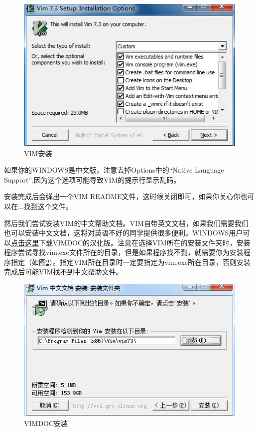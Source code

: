 \begin{figure}[htbp]
\centering
\includegraphics{tools/pic/vim_install_options.jpg}
\caption{VIM安装}
\label{fig:vim_install_options}
\end{figure}

如果你的WINDOWS是中文版，注意去掉Options中的“Native Language Support”,因为这个选项可能导致VIM的提示行显示乱码。

安装完成后会弹出一个VIM README文件，这时候关闭即可，如果你关心你也可以在...找到这个文件。

然后我们尝试安装VIM的中文帮助文档。VIM自带英文文档，如果我们需要我们也可以安装中文文档，这将对英语不好的同学提供很多便利。WINDOWS用户可以\href{ftp://ftp.vim.org/pub/vim/pc/gvim73_46.exe}{\textcolor[rgb]{0.0,0.0,1.0}{\uline{点击这里}}}下载VIMDOC的汉化版。注意在选择VIM所在的安装文件夹时，安装程序尝试寻找vim.exe文件所在的目录，但是如果程序找不到，就需要你为安装程序指定（如图\ref{fig:vimdoc_install_place}）。指定VIM所在目录时一定要指定为vim.exe所在目录，否则安装完成后可能VIM找不到中文帮助文件。
\begin{figure}[htbp]
\centering
\includegraphics{tools/pic/vimdoc_install_place.jpg}
\caption{VIMDOC安装}
\label{fig:vimdoc_install_place}
\end{figure}

